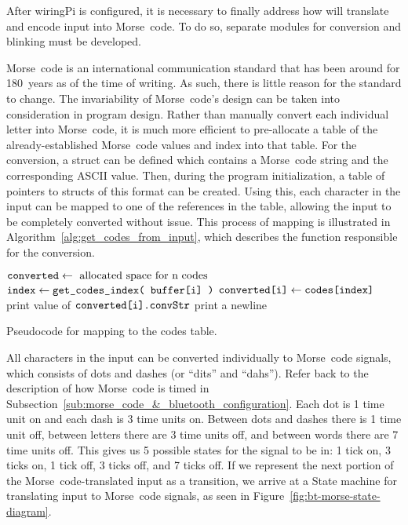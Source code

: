\documentclass[11pt]{article}
\begin{document}
After wiringPi is configured, it is necessary to finally address how  will translate and encode input into Morse~code.
To do so, separate modules for conversion and blinking must be developed.


Morse~code is an international communication standard that has been around for 180~years as of the time of writing.
As such, there is little reason for the standard to change.
The invariability of Morse~code's design can be taken into consideration in program design.
Rather than manually convert each individual letter into Morse~code, it is much more efficient to pre-allocate a table of the already-established Morse~code values and index into that table.
For the conversion, a struct can be defined which contains a Morse~code string and the corresponding ASCII value.
Then, during the program initialization, a table of pointers to structs of this format can be created.
Using this, each character in the input can be mapped to one of the references in the table, allowing the input to be completely converted without issue.
This process of mapping is illustrated in Algorithm~\ref{alg:get_codes_from_input}, which describes the function responsible for the conversion.


\begin{algorithm}[ht]
    \begin{algorithmic}[l]
            \State $\texttt{converted} \gets \text{ allocated space for n codes}$
                \State $\texttt{index} \gets \texttt{get\_codes\_index( buffer[i] )}$
                \State $\texttt{converted[i]} \gets \texttt{codes[index]}$
                \State print value of $\texttt{converted[i].convStr}$
            \EndFor
            \State print a newline
            \State \Return {}
        \EndProcedure
    \end{algorithmic}
    \caption{Pseudocode for mapping to the codes table.}
    \label{alg:get_codes_from_input}
\end{algorithm}


All characters in the input can be converted individually to Morse~code signals, which consists of dots and dashes (or ``dits'' and ``dahs'').
Refer back to the description of how Morse~code is timed in Subsection~\ref{sub:morse_code_&_bluetooth_configuration}.
Each dot is 1 time unit on and each dash is 3 time units on.
Between dots and dashes there is 1 time unit off, between letters there are 3 time units off, and between words there are 7 time units off.
This gives us 5 possible states for the signal to be in: 1 tick on, 3 ticks on, 1 tick off, 3 ticks off, and 7 ticks off.
If we represent the next portion of the Morse~code-translated input as a transition, we arrive at a State machine for translating input to Morse~code signals, as seen in Figure~\ref{fig:bt-morse-state-diagram}.
\end{document}
